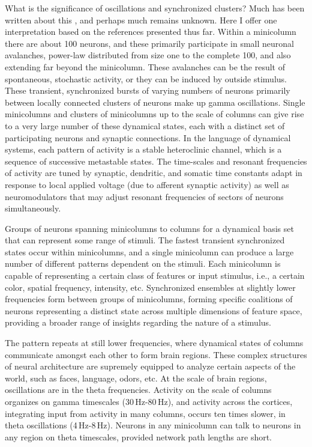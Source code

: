 \documentclass[twocolumn]{article}
\begin{document}
\vspace{3em}
What is the significance of oscillations and synchronized clusters? Much has been written about this \cite{}, and perhaps much remains unknown. Here I offer one interpretation based on the references presented thus far. Within a minicolumn there are about 100 neurons, and these primarily participate in small neuronal avalanches, power-law distributed from size one to the complete 100, and also extending far beyond the minicolumn. These avalanches can be the result of spontaneous, stochastic activity, or they can be induced by outside stimulus. These transient, synchronized bursts of varying numbers of neurons primarily between locally connected clusters of neurons make up gamma oscillations. Single minicolumns and clusters of minicolumns up to the scale of columns can give rise to a very large number of these dynamical states, each with a distinct set of participating neurons and synaptic connections. In the language of dynamical systems, each pattern of activity is a stable heteroclinic channel, which is a sequence of successive metastable states. The time-scales and resonant frequencies of activity are tuned by synaptic, dendritic, and somatic time constants adapt in response to local applied voltage (due to afferent synaptic activity) as well as neuromodulators that may adjust resonant frequencies of sectors of neurons simultaneously.

Groups of neurons spanning minicolumns to columns for a dynamical basis set \cite{rahu2008,one_from_reading_group} that can represent some range of stimuli. The fastest transient synchronized states occur within minicolumns, and a single minicolumn can produce a large number of different patterns dependent on the stimuli. Each minicolumn is capable of representing a certain class of features or input stimulus, i.e., a certain color, spatial frequency, intensity, etc. Synchronized ensembles at slightly lower frequencies form between groups of minicolumns, forming specific coalitions of neurons representing a distinct state across multiple dimensions of feature space, providing a broader range of insights regarding the nature of a stimulus. 

The pattern repeats at still lower frequencies, where dynamical states of columns communicate amongst each other to form brain regions. These complex structures of neural architecture are supremely equipped to analyze certain aspects of the world, such as faces, language, odors, etc. At the scale of brain regions, oscillations are in the theta frequencies. Activity on the scale of columns organizes on gamma timescales (30\,Hz-80\,Hz), and activity across the cortices, integrating input from activity in many columns, occurs ten times slower, in theta oscillations (4\,Hz-8\,Hz). Neurons in any minicolumn can talk to neurons in any region on theta timescales, provided network path lengths are short. 
\end{document}
